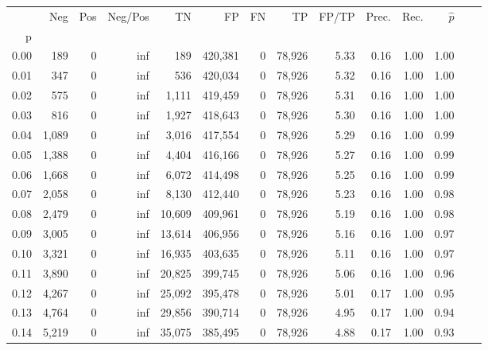 \begin{tabular}{rrrrrrrrrrrrrr}
\toprule
{} &    Neg &    Pos &  Neg/Pos &       TN &       FP &      FN &      TP & FP/TP & Prec. &  Rec. & $\hat{p}$ \\
p    &        &        &          &          &          &         &         &       &       &       &           \\
\midrule
0.00 &    189 &      0 &      inf &      189 &  420,381 &       0 &  78,926 &  5.33 &  0.16 &  1.00 &      1.00 \\
0.01 &    347 &      0 &      inf &      536 &  420,034 &       0 &  78,926 &  5.32 &  0.16 &  1.00 &      1.00 \\
0.02 &    575 &      0 &      inf &    1,111 &  419,459 &       0 &  78,926 &  5.31 &  0.16 &  1.00 &      1.00 \\
0.03 &    816 &      0 &      inf &    1,927 &  418,643 &       0 &  78,926 &  5.30 &  0.16 &  1.00 &      1.00 \\
0.04 &  1,089 &      0 &      inf &    3,016 &  417,554 &       0 &  78,926 &  5.29 &  0.16 &  1.00 &      0.99 \\
0.05 &  1,388 &      0 &      inf &    4,404 &  416,166 &       0 &  78,926 &  5.27 &  0.16 &  1.00 &      0.99 \\
0.06 &  1,668 &      0 &      inf &    6,072 &  414,498 &       0 &  78,926 &  5.25 &  0.16 &  1.00 &      0.99 \\
0.07 &  2,058 &      0 &      inf &    8,130 &  412,440 &       0 &  78,926 &  5.23 &  0.16 &  1.00 &      0.98 \\
0.08 &  2,479 &      0 &      inf &   10,609 &  409,961 &       0 &  78,926 &  5.19 &  0.16 &  1.00 &      0.98 \\
0.09 &  3,005 &      0 &      inf &   13,614 &  406,956 &       0 &  78,926 &  5.16 &  0.16 &  1.00 &      0.97 \\
0.10 &  3,321 &      0 &      inf &   16,935 &  403,635 &       0 &  78,926 &  5.11 &  0.16 &  1.00 &      0.97 \\
0.11 &  3,890 &      0 &      inf &   20,825 &  399,745 &       0 &  78,926 &  5.06 &  0.16 &  1.00 &      0.96 \\
0.12 &  4,267 &      0 &      inf &   25,092 &  395,478 &       0 &  78,926 &  5.01 &  0.17 &  1.00 &      0.95 \\
0.13 &  4,764 &      0 &      inf &   29,856 &  390,714 &       0 &  78,926 &  4.95 &  0.17 &  1.00 &      0.94 \\
0.14 &  5,219 &      0 &      inf &   35,075 &  385,495 &       0 &  78,926 &  4.88 &  0.17 &  1.00 &      0.93 \\

\end{tabular}
